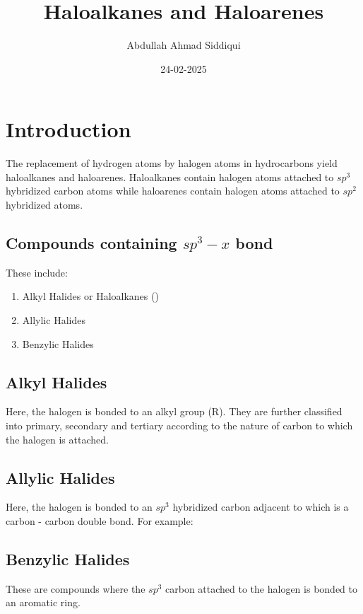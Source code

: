 \documentclass{article}
\title{Haloalkanes and Haloarenes}
\author{Abdullah Ahmad Siddiqui}
\date{24-02-2025}
\begin{document}
\maketitle
\tableofcontents 

\section{Introduction}
The replacement of hydrogen atoms by halogen atoms in hydrocarbons
yield haloalkanes and haloarenes.
Haloalkanes contain halogen atoms attached to $sp^3$
hybridized carbon atoms while haloarenes contain halogen
atoms attached to $sp^2$ hybridized atoms.
\subsection{Compounds containing $sp^3-x$ bond}
These include:
\begin{enumerate}
  \item Alkyl Halides or Haloalkanes ()
  \item{Allylic Halides}
  \item{Benzylic Halides}
\end{enumerate}
\subsection*{Alkyl Halides}
Here, the halogen is bonded to an alkyl group (R). They are further 
classified into primary, secondary and tertiary according to the
nature of carbon to which the halogen is attached.

\newpage{}
\qquad
{} \qquad{}
\subsection*{Allylic Halides}
Here, the halogen is bonded to an $sp^3$ hybridized carbon adjacent
to which is a carbon - carbon double bond. For example:
\vspace{5mm}

\linebreak{}
\vspace{5mm}

\subsection*{Benzylic Halides}
These are compounds where the $sp^3$ carbon attached to the halogen is bonded
to an aromatic ring.
\vspace{5mm}
\end{document}
